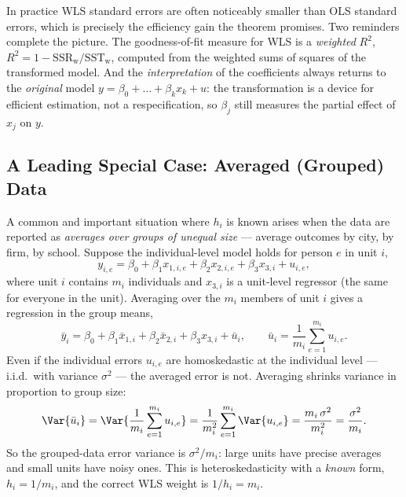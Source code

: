 
In practice WLS standard errors are often noticeably smaller than OLS standard errors, which is precisely the efficiency gain the theorem promises. Two reminders complete the picture. The goodness-of-fit measure for WLS is a \emph{weighted} $R^2$, $R^2 = 1 - \text{SSR}_{\text{w}}/\text{SST}_{\text{w}}$, computed from the weighted sums of squares of the transformed model. And the \emph{interpretation} of the coefficients always returns to the \emph{original} model $y = \beta_0 + \dots + \beta_k x_k + u$: the transformation is a device for efficient estimation, not a respecification, so $\beta_j$ still measures the partial effect of $x_j$ on $y$.


\subsection{A Leading Special Case: Averaged (Grouped) Data}

A common and important situation where $h_i$ is known arises when the data are reported as \emph{averages over groups of unequal size} --- average outcomes by city, by firm, by school. Suppose the individual-level model holds for person $e$ in unit $i$,
\[
y_{i,e} = \beta_0 + \beta_1 x_{1,i,e} + \beta_2 x_{2,i,e} + \beta_3 x_{3,i} + u_{i,e},
\]
where unit $i$ contains $m_i$ individuals and $x_{3,i}$ is a unit-level regressor (the same for everyone in the unit). Averaging over the $m_i$ members of unit $i$ gives a regression in the group means,
\[
\bar y_i = \beta_0 + \beta_1 \bar x_{1,i} + \beta_2 \bar x_{2,i} + \beta_3 x_{3,i} + \bar u_i,
\qquad
\bar u_i = \frac{1}{m_i}\sum_{e=1}^{m_i} u_{i,e} .
\]
Even if the individual errors $u_{i,e}$ are homoskedastic at the individual level --- i.i.d.\ with variance $\sigma^2$ --- the averaged error is not. Averaging shrinks variance in proportion to group size:
\[
\Var{\bar u_i} = \Var{\frac{1}{m_i}\sum_{e=1}^{m_i} u_{i,e}} = \frac{1}{m_i^2}\sum_{e=1}^{m_i} \Var{u_{i,e}} = \frac{m_i\,\sigma^2}{m_i^2} = \frac{\sigma^2}{m_i} .
\]
So the grouped-data error variance is $\sigma^2/m_i$: large units have precise averages and small units have noisy ones. This is heteroskedasticity with a \emph{known} form, $h_i = 1/m_i$, and the correct WLS weight is $1/h_i = m_i$.

